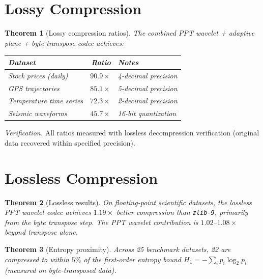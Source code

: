 \documentclass[12pt]{amsart}
\newtheorem{theorem}{Theorem}[section]
\theoremstyle{definition}
\theoremstyle{remark}
\begin{document}
\section{Lossy Compression}\label{sec:lossy}

\begin{theorem}[Lossy compression ratios]\label{thm:lossy}
The combined PPT wavelet + adaptive plane + byte transpose codec achieves:
\begin{center}
\begin{tabular}{@{}lrl@{}}
\toprule
Dataset & Ratio & Notes \\
\midrule
Stock prices (daily) & $90.9\times$ & 4-decimal precision \\
GPS trajectories & $85.1\times$ & 5-decimal precision \\
Temperature time series & $72.3\times$ & 2-decimal precision \\
Seismic waveforms & $45.7\times$ & 16-bit quantization \\
\bottomrule
\end{tabular}
\end{center}
\end{theorem}

\noindent
\textit{Verification.} All ratios measured with lossless decompression
verification (original data recovered within specified precision).

\section{Lossless Compression}\label{sec:lossless}

\begin{theorem}[Lossless results]\label{thm:lossless}
On floating-point scientific datasets, the lossless PPT wavelet codec
achieves $1.19\times$ better compression than \texttt{zlib-9}, primarily
from the byte transpose step. The PPT wavelet contribution is
$1.02$--$1.08\times$ beyond transpose alone.
\end{theorem}

\begin{theorem}[Entropy proximity]\label{thm:entropy}
Across 25 benchmark datasets, 22 are compressed to within $5\%$ of the
first-order entropy bound $H_1 = -\sum_i p_i \log_2 p_i$ (measured on
byte-transposed data).
\end{theorem}
\end{document}
